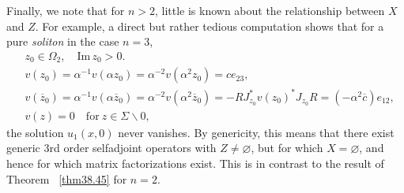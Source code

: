 \documentclass{surv-l}
\theoremstyle{plain}
\theoremstyle{definition}
\numberwithin{equation}{chapter}
\begin{document}
Finally, we note that for $n>2$, little is known about the relationship between $X$ and $Z$. For example, a direct but rather tedious computation shows that for a pure \emph{soliton} in the case $n=3$,
\begin{align*}
& z_{0}\in\Omega_{2},\quad \mathrm{Im}\, z_{0}>0.\\
& v(z_{0})=\alpha^{-1}v(\alpha z_{0})=\alpha^{-2}v(\alpha^{2}z_{0})=ce_{23},\\
& v(\overline{z}_{0})=\alpha^{-1}v(\alpha\overline{z}_{0})=\alpha^{-2}v(\alpha^{2}\overline{z}_{0}) = -RJ_{z_{0}}^{*}v(z_{0})^{*}J_{z_{0}}R = (-\alpha^{2}\overline{c})e_{12},\\
& v(z) =0\quad \mathrm{for}\ z \in\Sigma\backslash 0,
\end{align*}
the solution $u_{1}(x, 0)$ never vanishes. By genericity, this means that there exist generic 3rd order selfadjoint operators with $Z\neq\varnothing$, but for which $X=\varnothing$, and hence for which matrix factorizations exist. This is in contrast to the result of Theorem ~\ref{thm38.45} for $n =2$.
\end{document}
